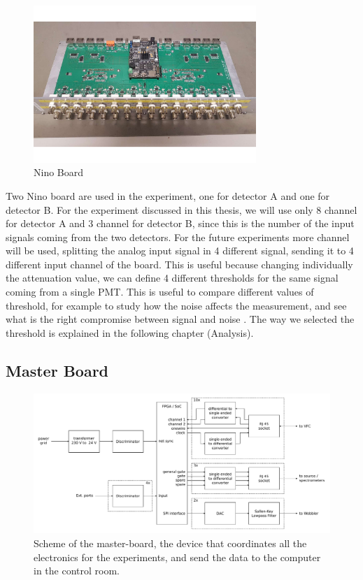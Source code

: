 \begin{figure}[hbtp]
\centering
\includegraphics[width = 0.75\textwidth]{ExperimentalSetup/NINO.pdf}
\caption{Nino Board}
\label{fig:NinoBoard}
\end{figure}

Two Nino board are used in the experiment, one for detector A and one for detector B. For the experiment discussed in this thesis, we will use only 8 channel for detector A and 3 channel for detector B, since this is the number of the input signals coming from the two detectors. For the future experiments more channel will be used, splitting the analog input signal in 4 different signal, sending it to 4 different input channel of the board. This is useful because changing individually the attenuation value, we can define 4 different thresholds for the same signal coming from a single PMT. This is useful to compare different values of threshold, for example to study how the noise affects the measurement, and see what is the right compromise between signal and noise  .
The way we selected the threshold is explained in the following chapter (Analysis).

\subsection{Master Board}

\begin{figure}[hbtp]

\centering
\includegraphics[width = \textwidth]{ExperimentalSetup/masterboard.pdf}
\caption{Scheme of the master-board, the device that coordinates all the electronics for the experiments, and send the data to the computer in the control room.}
\end{figure}

